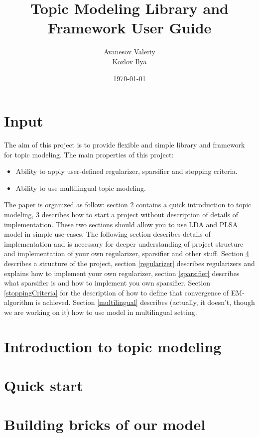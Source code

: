 \documentclass{article}
\title{Topic Modeling Library and Framework User Guide}
\author{Avanesov Valeriy\\Kozlov Ilya}
\date{\today}
\begin{document}
\maketitle

\section{Input}
    The aim of this project is to provide flexible and simple library and framework for topic modeling.
    The main properties of this project:
    \begin{itemize}
	\item Ability to apply user-defined regularizer, sparsifier and stopping criteria.
	\item Ability to use multilingual topic modeling. 
    \end{itemize}
    The paper is organized as follow: section \ref{intro} contains a quick introduction to topic modeling,
    \ref{quickStart} describes how to start a project without description of details of implementation. These two sections should allow you
    to use LDA and PLSA  model in simple use\--cases. The following section describes details of implementation and is necessary for
    deeper understanding of project structure and implementation of your own regularizer, sparsifier and other stuff.
    Section \ref{projectStructure} describes a structure of the project, section \ref{regularizer} describes regularizers and explains how to implement your
    own regularizer, section \ref{sparsifier} describes what sparsifier is and how to implement you own sparsifier. Section \ref{stoppingCriteria} for the 
    description of how to define that convergence of EM-algorithm is achieved. Section \ref{multilingual} describes (actually, it doesn't, though we are working on it) how to use model in multilingual setting. 

\clearpage	\section{Introduction to topic modeling}  \label{intro} 

\clearpage	\section{Quick start} \label{quickStart} 

\clearpage	\section{Building bricks of our model} \label{projectStructure} 
\end{document}
